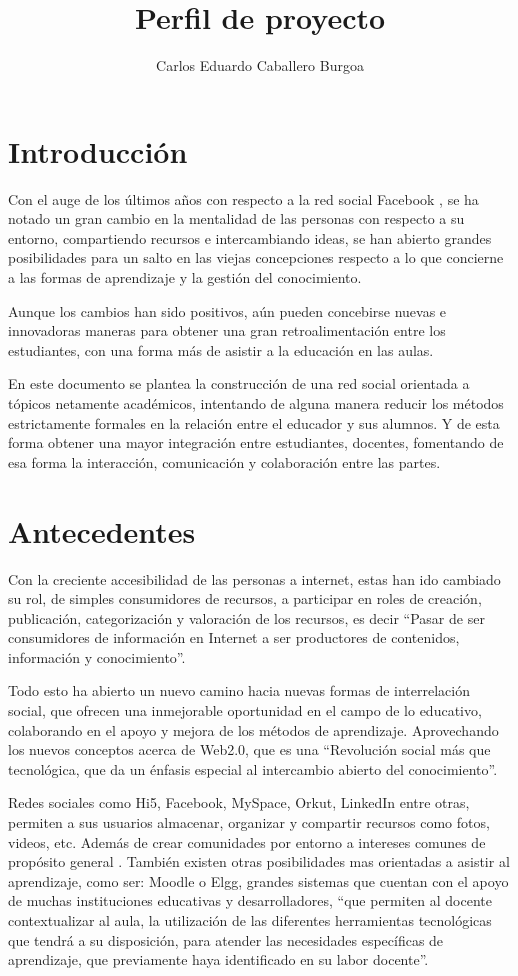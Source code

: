 \documentclass[letterpaper,11pt]{article}
\title{Perfil de proyecto}
\author{Carlos Eduardo Caballero Burgoa}
\begin{document}
\maketitle
\section{Introducción}
Con el auge de los últimos años con respecto a la red social Facebook \cite{Jeria}, se ha
notado un gran cambio en la mentalidad de las personas con respecto a su entorno,
compartiendo recursos e intercambiando ideas, se han abierto grandes posibilidades para un
salto en las viejas concepciones respecto a lo que concierne a las formas de aprendizaje y
la gestión del conocimiento.

Aunque los cambios han sido positivos, aún pueden concebirse nuevas e innovadoras
maneras para obtener una gran retroalimentación entre los estudiantes, con una forma
más de asistir a la educación en las aulas.

En este documento se plantea la construcción de una red social orientada a tópicos
netamente académicos, intentando de alguna manera reducir los métodos estrictamente
formales en la relación entre el educador y sus alumnos. Y de esta forma obtener una 
mayor integración entre estudiantes, docentes, fomentando de esa forma la interacción, 
comunicación y colaboración entre las partes.

\section{Antecedentes}
Con la creciente accesibilidad de las personas a internet, estas han ido cambiado su rol,
de simples consumidores de recursos, a participar en roles de creación, publicación,
categorización y valoración de los recursos, es decir “Pasar de ser consumidores de
información en Internet a ser productores de contenidos, información y conocimiento”.
\cite{Rodriguez}

Todo esto ha abierto un nuevo camino hacia nuevas formas de interrelación social, que
ofrecen una inmejorable oportunidad en el campo de lo educativo, colaborando en el
apoyo y mejora de los métodos de aprendizaje. Aprovechando los nuevos conceptos
acerca de Web2.0, que es una “Revolución social más que tecnológica, que da un énfasis
especial al intercambio abierto del conocimiento”. \cite{Rodriguez}

Redes sociales como Hi5, Facebook, MySpace, Orkut, LinkedIn entre otras, permiten a sus 
usuarios almacenar, organizar y compartir recursos como fotos, videos, etc. Además de
crear comunidades por entorno a intereses comunes de propósito general \cite{Rodriguez}.
También existen otras posibilidades mas orientadas a asistir al aprendizaje, como ser:
Moodle o Elgg, grandes sistemas que cuentan con el apoyo de muchas instituciones
educativas y desarrolladores, “que permiten al docente contextualizar al aula, la
utilización de las diferentes herramientas tecnológicas que tendrá a su disposición,
para atender las necesidades específicas de aprendizaje, que previamente haya
identificado en su labor docente”. \cite{Gonzalez}
\end{document}
